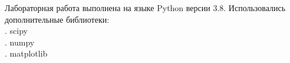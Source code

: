 \documentclass[../main.tex]{subfiles}
\begin{document}
    \noindent Лабораторная работа выполнена на языке Python версии 3.8. 
    \newline Использовались дополнительные библиотеки:\\
        . scipy\\
        . numpy\\
        . matplotlib\\
\end{document}
